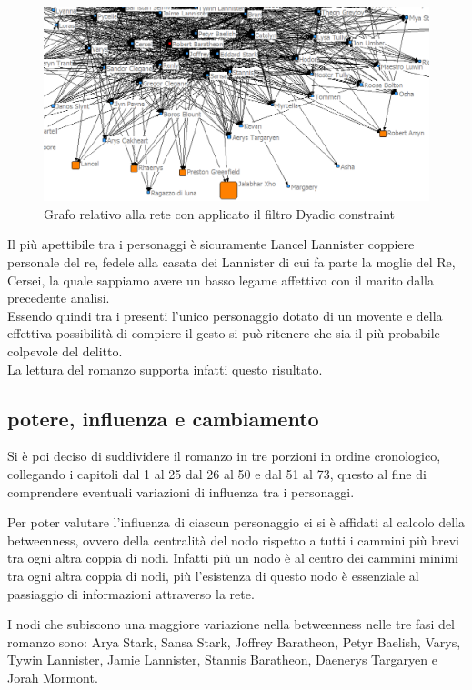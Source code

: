 \documentclass[a4paper]{article}
\begin{document}
\begin{figure}[h]
\centering
\includegraphics[width=.8\textwidth]{picture/33.png}
\caption{Grafo relativo alla rete con applicato il filtro Dyadic constraint}
\label{fig:grafo-dyadic-constraint}
\end{figure}

Il più apettibile tra i personaggi è sicuramente Lancel Lannister coppiere personale del re, fedele alla casata dei Lannister di cui fa parte la moglie del Re, Cersei, la quale sappiamo avere un basso legame affettivo con il marito dalla precedente analisi.\\
Essendo quindi tra i presenti l'unico personaggio dotato di un movente e della effettiva possibilità di compiere il gesto si può ritenere che sia il più probabile colpevole del delitto.\\
La lettura del romanzo supporta infatti questo risultato.

\subsection{potere, influenza e cambiamento}

Si è poi deciso di suddividere il romanzo in tre porzioni in ordine cronologico, collegando i capitoli dal 1 al 25 dal 26 al 50 e dal 51 al 73, questo al fine di comprendere eventuali variazioni di influenza tra i personaggi.

Per poter valutare l'influenza di ciascun personaggio ci si è affidati al calcolo della betweenness, ovvero della centralità del nodo rispetto a tutti i cammini più brevi tra ogni altra coppia di nodi. Infatti più un nodo è al centro dei cammini minimi tra ogni altra coppia di nodi, più l'esistenza di questo nodo è essenziale al passiaggio di informazioni attraverso la rete.

I nodi che subiscono una maggiore variazione nella betweenness nelle tre fasi del romanzo sono:
Arya Stark, Sansa Stark, Joffrey Baratheon, Petyr Baelish, Varys, Tywin Lannister, Jamie Lannister, Stannis Baratheon, Daenerys Targaryen e Jorah Mormont.
\end{document}
